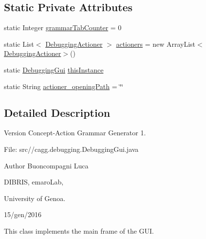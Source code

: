 \subsection*{Static Private Attributes}
\begin{DoxyCompactItemize}
\item 
static Integer \hyperlink{classit_1_1emarolab_1_1cagg_1_1debugging_1_1DebuggingGui_adfd9bc3e068ae7cde1f2d521f54110e0}{grammar\-Tab\-Counter} = 0
\item 
static List$<$ \hyperlink{classit_1_1emarolab_1_1cagg_1_1debugging_1_1DebuggingGui_1_1DebuggingActioner}{Debugging\-Actioner} $>$ \hyperlink{classit_1_1emarolab_1_1cagg_1_1debugging_1_1DebuggingGui_a571f171ad91164c4bf9a2a27e0ddbcf8}{actioners} = new Array\-List$<$ \hyperlink{classit_1_1emarolab_1_1cagg_1_1debugging_1_1DebuggingGui_1_1DebuggingActioner}{Debugging\-Actioner}$>$()
\item 
static \hyperlink{classit_1_1emarolab_1_1cagg_1_1debugging_1_1DebuggingGui}{Debugging\-Gui} \hyperlink{classit_1_1emarolab_1_1cagg_1_1debugging_1_1DebuggingGui_a9acdcdcb31dcfc0a1d1eca767a953620}{this\-Instance}
\item 
static String \hyperlink{classit_1_1emarolab_1_1cagg_1_1debugging_1_1DebuggingGui_a609ea4e6e07848461ed41d9bcfbc9e9d}{actioner\-\_\-opening\-Path} = \char`\"{}\char`\"{}
\end{DoxyCompactItemize}


\subsection{Detailed Description}
\begin{DoxyVersion}{Version}
Concept-\/\-Action Grammar Generator 1. \par
 File\-: src//cagg.debugging.\-Debugging\-Gui.\-java \par

\end{DoxyVersion}
\begin{DoxyAuthor}{Author}
Buoncompagni Luca \par
 D\-I\-B\-R\-I\-S, emaro\-Lab,\par
 University of Genoa. \par
 15/gen/2016 \par

\end{DoxyAuthor}


This class implements the main frame of the G\-U\-I. 

